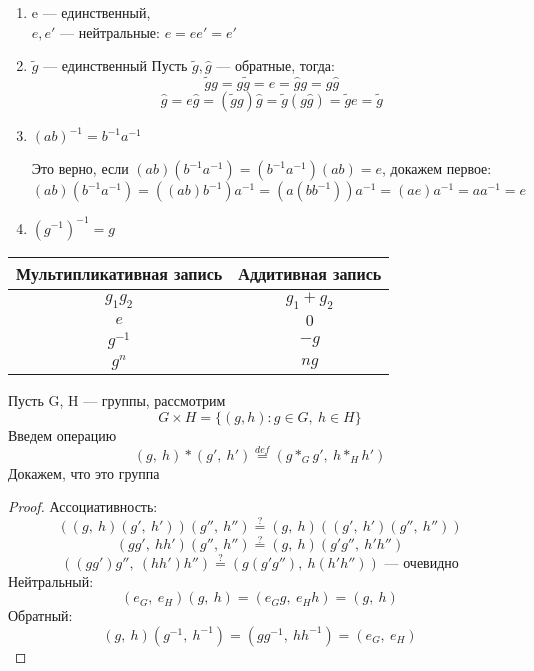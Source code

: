 \documentclass[main]{subfiles}
\begin{document}
    \begin{theorem}
        \begin{enumerate}
            \item e --- единственный, \\
                $e,e'$ --- нейтральные: $e=e e'=e'$
            \item $\widetilde{g}$ --- единственный
                Пусть $\widetilde{g},\hat{g}$ --- обратные, тогда:
                \[\widetilde{g}g = g\widetilde{g} = e = \hat{g}g = g\hat{g}\]
                \[\hat{g}=e \hat{g}=(\widetilde{g}g)\hat{g}=\widetilde{g}(g\hat{g})=\widetilde{g}e=\widetilde{g}\]
                \item $(a b)^{-1}=b^{-1}a^{-1}$

                Это верно, если $(ab)(b^{-1}a^{-1})=(b^{-1}a^{-1})(ab)=e$, докажем первое:
                \[(ab)(b^{-1}a^{-1})=((ab)b^{-1})a^{-1}=(a(bb^{-1}))a^{-1}=(ae)a^{-1}=a a^{-1}=e\]
            \item $(g^{-1})^{-1}=g$
        \end{enumerate}
    \end{theorem}

    \begin{tabular} {c|c}
    	Мультипликативная запись & Аддитивная запись\\ \hline
    	$g_1 g_2$ & $g_1 + g_2$\\
    	$e$ & $0$\\
    	$g^{-1}$ & $-g$\\
        $g^n$ & $ng$
    \end{tabular}

    \begin{definition}
		Пусть G, H --- группы, рассмотрим
		\[G \times H = \{(g,h): g\in G,\ h\in H\}\]
		Введем операцию
		\[(g,\ h)*(g',\ h')\overset{def}{=}(g*_G g',\ h*_H h')\]
		Докажем, что это группа
	\end{definition}

	\begin{proof}
		Ассоциативность:
        \[((g,\ h)(g',\ h'))(g'',\ h'') \overset{?}{=} (g,\ h)((g',\ h')(g'',\ h''))\]
		\[(gg',\ hh')(g'',\ h'') \overset{?}{=} (g,\ h)(g' g'',\ h' h'')\]
        \[((gg')g'',\ (hh')h'') \overset{?}{=} (g(g'g''),\ h(h'h'')) \text{ --- очевидно}\]
		Нейтральный:
		\[(e_G,\ e_H)(g,\ h) = (e_G g,\ e_H h) = (g,\ h)\]
		Обратный:
		\[(g,\ h)(g^{-1},\ h^{-1}) = (g g^{-1},\ h h^{-1}) = (e_G,\ e_H)\]
	\end{proof}
\end{document}
